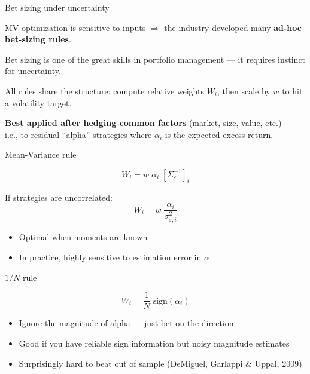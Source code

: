 \documentclass[aspectratio=169,10pt]{beamer}
\begin{document}

\begin{frame}{Bet sizing under uncertainty}

MV optimization is sensitive to inputs $\Rightarrow$ the industry developed many \textbf{ad-hoc bet-sizing rules}.

\vskip 10pt

Bet sizing is one of the great skills in portfolio management --- it requires instinct for uncertainty.

\vskip 10pt

All rules share the structure: compute relative weights $W_i$, then scale by $w$ to hit a volatility target.

\vskip 10pt

\textbf{Best applied after hedging common factors} (market, size, value, etc.) --- i.e., to residual ``alpha'' strategies where $\alpha_i$ is the expected excess return.

\end{frame}


\begin{frame}{Mean-Variance rule}

$$W_i = w \; \alpha_i \; [\Sigma_\varepsilon^{-1}]_i$$

\vskip 8pt

If strategies are uncorrelated:
$$W_i = w \; \frac{\alpha_i}{\sigma_{\varepsilon,i}^2}$$

\vskip 10pt

\begin{itemize}
\item Optimal when moments are known
\item In practice, highly sensitive to estimation error in $\alpha$
\end{itemize}

\end{frame}


\begin{frame}{$1/N$ rule}

$$W_i = \frac{1}{N} \; \text{sign}(\alpha_i)$$

\vskip 10pt

\begin{itemize}
\item Ignore the magnitude of alpha --- just bet on the direction
\item Good if you have reliable sign information but noisy magnitude estimates
\item Surprisingly hard to beat out of sample (DeMiguel, Garlappi \& Uppal, 2009)
\end{itemize}

\end{frame}
\end{document}
